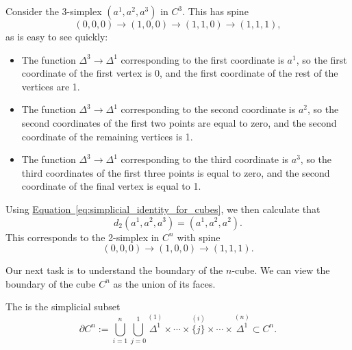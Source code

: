 \documentclass[main.tex]{subfiles}
\begin{document}
\begin{example}
  Consider the 3-simplex $(a^{1}, a^{2}, a^{3})$ in $C^{3}$. This has spine
  \begin{equation*}
    (0, 0, 0) \to (1, 0, 0) \to (1, 1, 0) \to (1, 1, 1),
  \end{equation*}
  as is easy to see quickly:
  \begin{itemize}
    \item The function $\Delta^{3} \to \Delta^{1}$ corresponding to the first coordinate is $a^{1}$, so the first coordinate of the first vertex is 0, and the first coordinate of the rest of the vertices are 1.

    \item The function $\Delta^{3} \to \Delta^{1}$ corresponding to the second coordinate is $a^{2}$, so the second coordinates of the first two points are equal to zero, and the second coordinate of the remaining vertices is 1.

    \item The function $\Delta^{3} \to \Delta^{1}$ corresponding to the third coordinate is $a^{3}$, so the third coordinates of the first three points is equal to zero, and the second coordinate of the final vertex is equal to 1.
  \end{itemize}
  Using \hyperref[eq:simplicial_identity_for_cubes]{Equation~\ref*{eq:simplicial_identity_for_cubes}}, we then calculate that
  \begin{equation*}
    d_{2} (a^{1}, a^{2}, a^{3}) = (a^{1}, a^{2}, a^{2}).
  \end{equation*}
  This corresponds to the 2-simplex in $C^{n}$ with spine
  \begin{equation*}
    (0, 0, 0) \to (1, 0, 0) \to (1, 1, 1).
  \end{equation*}
\end{example}

Our next task is to understand the boundary of the $n$-cube. We can view the boundary of the cube $C^{n}$ as the union of its faces.

\begin{definition}
  \label{def:boundary_of_n-cube}
  The  is the simplicial subset
  \begin{equation}
    \label{eq:boundary_of_cube}
    \partial C^{n} := \bigcup_{i = 1}^{n} \bigcup_{j = 0}^{1} \overset{(1)}{\Delta^{1}} \times \cdots \times \overset{(i)}{\{j\}} \times \cdots \times \overset{(n)}{\Delta^{1}} \subset C^{n}.
  \end{equation}
\end{definition}
\end{document}
